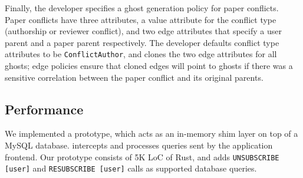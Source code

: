 %
Finally, the developer specifies a ghost generation policy for paper conflicts. Paper conflicts have
three attributes, a value attribute for the conflict type (authorship or reviewer conflict), and two
edge attributes that specify a user parent and a paper parent respectively. The developer defaults
conflict type attributes to be \texttt{ConflictAuthor}, and clones the two edge attributes for all
ghosts; edge policies ensure that cloned edges will point to ghosts if there was a sensitive correlation between
the paper conflict and its original parents. 

%

\subsection{\sys Performance}
We implemented a \sys prototype, which acts as an in-memory shim layer on top
of a MySQL database. \sys intercepts and processes queries sent by the application frontend. 
Our prototype consists of 5K LoC of Rust, and adds \texttt{UNSUBSCRIBE
[user]} and \texttt{RESUBSCRIBE [user]} calls as supported database queries.

